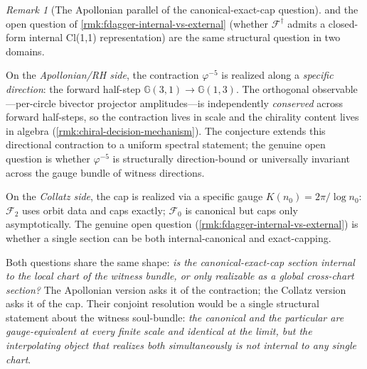 \documentclass[11pt,a4paper]{article}
\theoremstyle{plain}
\theoremstyle{definition}
\theoremstyle{remark}
\newtheorem{remark}[theorem]{Remark}
\numberwithin{equation}{section}
\newcommand{\Cl}{\mathbb{G}}
\newcommand{\vp}{\varphi}
\begin{document}
\begin{remark}[The Apollonian parallel of the canonical-exact-cap question]
\label{rmk:phi5-canonical-exact-cap}
 and the open question of
\cref{rmk:fdagger-internal-vs-external} (whether
$\mathcal{F}^{\dagger}$ admits a closed-form internal Cl(1,1)
representation) are the same structural question in two domains.

On the \emph{Apollonian/RH side}, the contraction $\vp^{-5}$ is
realized along a \emph{specific direction}: the forward half-step
$\Cl(3,1)\to\Cl(1,3)$.  The orthogonal observable---per-circle
bivector projector amplitudes---is independently \emph{conserved}
across forward half-steps, so the contraction lives in scale and
the chirality content lives in algebra
(\cref{rmk:chiral-decision-mechanism}).  The conjecture extends
this directional contraction to a uniform spectral statement; the
genuine open question is whether $\vp^{-5}$ is structurally
direction-bound or universally invariant across the gauge bundle of
witness directions.

On the \emph{Collatz side}, the cap is realized via a specific
gauge $K(n_0)=2\pi/\log n_0$: $\mathcal{F}_2$ uses orbit data and
caps exactly; $\mathcal{F}_0$ is canonical but caps only
asymptotically.  The genuine open question
(\cref{rmk:fdagger-internal-vs-external}) is whether a single
section can be both internal-canonical and exact-capping.

Both questions share the same shape: \emph{is the canonical-exact-cap
section internal to the local chart of the witness bundle, or only
realizable as a global cross-chart section?}  The Apollonian version
asks it of the contraction; the Collatz version asks it of the cap.
Their conjoint resolution would be a single structural statement
about the witness soul-bundle: \emph{the canonical and the
particular are gauge-equivalent at every finite scale and identical
at the limit, but the interpolating object that realizes both
simultaneously is not internal to any single chart}.


\end{remark}
\end{document}
